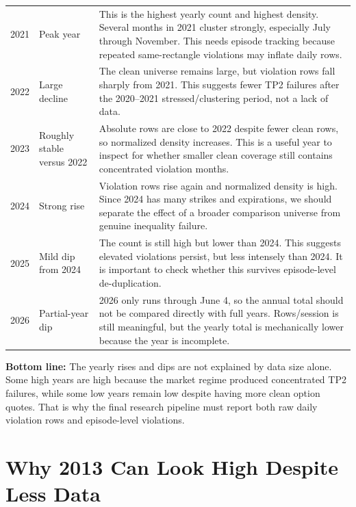 \documentclass[11pt]{article}
\begin{document}
\begin{center}
\begin{tabular}{p{}p{}p{}}
2021 & Peak year &
This is the highest yearly count and highest density. Several months in 2021
cluster strongly, especially July through November. This needs episode
tracking because repeated same-rectangle violations may inflate daily rows. \\

2022 & Large decline &
The clean universe remains large, but violation rows fall sharply from 2021.
This suggests fewer TP2 failures after the 2020--2021 stressed/clustering
period, not a lack of data. \\

2023 & Roughly stable versus 2022 &
Absolute rows are close to 2022 despite fewer clean rows, so normalized density
increases. This is a useful year to inspect for whether smaller clean coverage
still contains concentrated violation months. \\

2024 & Strong rise &
Violation rows rise again and normalized density is high. Since 2024 has many
strikes and expirations, we should separate the effect of a broader comparison
universe from genuine inequality failure. \\

2025 & Mild dip from 2024 &
The count is still high but lower than 2024. This suggests elevated violations
persist, but less intensely than 2024. It is important to check whether this
survives episode-level de-duplication. \\

2026 & Partial-year dip &
2026 only runs through June 4, so the annual total should not be compared
directly with full years. Rows/session is still meaningful, but the yearly
total is mechanically lower because the year is incomplete. \\
\bottomrule
\end{tabular}
\end{center}

\textbf{Bottom line:}
The yearly rises and dips are not explained by data size alone. Some high years
are high because the market regime produced concentrated TP2 failures, while
some low years remain low despite having more clean option quotes. That is why
the final research pipeline must report both raw daily violation rows and
episode-level violations.

\section*{Why 2013 Can Look High Despite Less Data}
\end{document}
